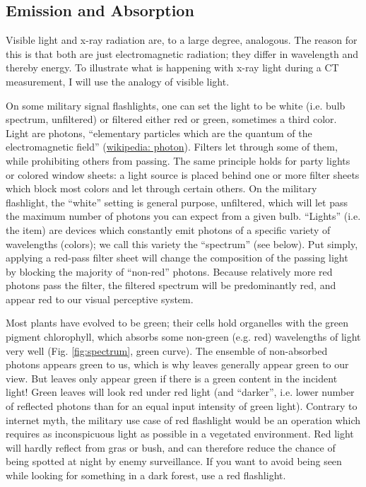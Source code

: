 \subsection{Emission and Absorption}
\label{sec:orgd93bb73}
Visible light and x-ray radiation are, to a large degree, analogous.
The reason for this is that both are just electromagnetic radiation; they differ in wavelength and thereby energy.
To illustrate what is happening with x-ray light during a CT measurement, I will use the analogy of visible light.


On some military signal flashlights, one can set the light to be white (i.e. bulb spectrum, unfiltered) or filtered either red or green, sometimes a third color.
Light are photons, ``elementary particles which are the quantum of the electromagnetic field'' (\href{https://en.wikipedia.org/wiki/Photon}{wikipedia: photon}).
Filters let through some of them, while prohibiting others from passing.
The same principle holds for party lights or colored window sheets: a light source is placed behind one or more filter sheets which block most colors and let through certain others.
On the military flashlight, the ``white'' setting is general purpose, unfiltered, which will let pass the maximum number of photons you can expect from a given bulb.
``Lights'' (i.e. the item) are devices which constantly emit photons of a specific variety of wavelengths (colors); we call this variety the ``spectrum'' (see below).
Put simply, applying a red-pass filter sheet will change the composition of the passing light by blocking the majority of ``non-red'' photons.
Because relatively more red photons pass the filter, the filtered spectrum will be predominantly red, and appear red to our visual perceptive system.

Most plants have evolved to be green; their cells hold organelles with the green pigment chlorophyll, which absorbs some non-green (e.g. red) wavelengths of light very well (Fig. \ref{fig:spectrum}, green curve).
The ensemble of non-absorbed photons appears green to us, which is why leaves generally appear green to our view.
But leaves only appear green if there is a green content in the incident light!
Green leaves will look red under red light (and ``darker'', i.e. lower number of reflected photons than for an equal input intensity of green light).
Contrary to internet myth, the military use case of red flashlight would be an operation which requires as inconspicuous light as possible in a vegetated environment.
Red light will hardly reflect from gras or bush, and can therefore reduce the chance of being spotted at night by enemy surveillance.
If you want to avoid being seen while looking for something in a dark forest, use a red flashlight.


